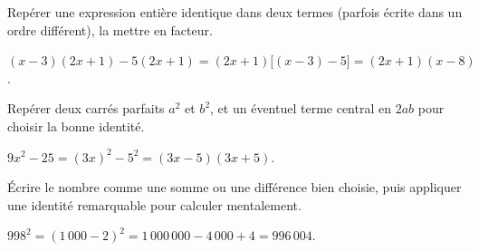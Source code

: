 Repérer une expression entière identique dans deux termes (parfois écrite dans un ordre
différent), la mettre en facteur.
\begin{exemple}
$(x-3)(2x+1)-5(2x+1)=(2x+1)\big[(x-3)-5\big]=(2x+1)(x-8)$.
\end{exemple}

Repérer deux carrés parfaits $a^{2}$ et $b^{2}$, et un éventuel terme central en $2ab$ pour
choisir la bonne identité.
\begin{exemple}
$9x^{2}-25=(3x)^{2}-5^{2}=(3x-5)(3x+5)$.
\end{exemple}

Écrire le nombre comme une somme ou une différence bien choisie, puis appliquer une
identité remarquable pour calculer mentalement.
\begin{exemple}
$998^{2}=(1\,000-2)^{2}=1\,000\,000-4\,000+4=996\,004$.
\end{exemple}

